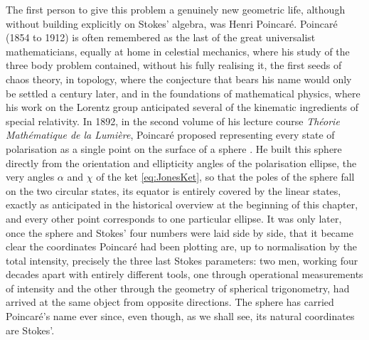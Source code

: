         The first person to give this problem a genuinely new geometric life, although without building explicitly on Stokes' algebra, was Henri Poincaré. Poincaré (1854 to 1912) is often remembered as the last of the great universalist mathematicians, equally at home in celestial mechanics, where his study of the three body problem contained, without his fully realising it, the first seeds of chaos theory, in topology, where the conjecture that bears his name would only be settled a century later, and in the foundations of mathematical physics, where his work on the Lorentz group anticipated several of the kinematic ingredients of special relativity. In 1892, in the second volume of his lecture course \textit{Théorie Mathématique de la Lumière}, Poincaré proposed representing every state of polarisation as a single point on the surface of a sphere \citep{poincare1892theorie}. He built this sphere directly from the orientation and ellipticity angles of the polarisation ellipse, the very angles $\alpha$ and $\chi$ of the ket \ref{eq:JonesKet}, so that the poles of the sphere fall on the two circular states, its equator is entirely covered by the linear states, exactly as anticipated in the historical overview at the beginning of this chapter, and every other point corresponds to one particular ellipse. It was only later, once the sphere and Stokes' four numbers were laid side by side, that it became clear the coordinates Poincaré had been plotting are, up to normalisation by the total intensity, precisely the three last Stokes parameters: two men, working four decades apart with entirely different tools, one through operational measurements of intensity and the other through the geometry of spherical trigonometry, had arrived at the same object from opposite directions. The sphere has carried Poincaré's name ever since, even though, as we shall see, its natural coordinates are Stokes'.

